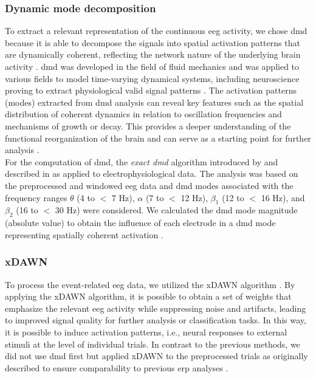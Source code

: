 \subsubsection{Dynamic mode decomposition}
To extract a relevant representation of the continuous \gls{eeg} activity, we chose \gls{dmd} because it is able to decompose the signals into spatial activation patterns that are dynamically coherent, reflecting the network nature of the underlying brain activity \cite{Brunton2016}. \Gls{dmd} was developed in the field of fluid mechanics and was applied to various fields to model time-varying dynamical systems, including neuroscience proving to extract physiological valid signal patterns \cite{Brunton2016, Kunert-Graf2019, Schmid2010, Schmid2008}. The activation patterns (modes) extracted from \gls{dmd} analysis can reveal key features such as the spatial distribution of coherent dynamics in relation to oscillation frequencies and mechanisms of growth or decay. This provides a deeper understanding of the functional reorganization of the brain and can serve as a starting point for further analysis \cite{Brunton2016}.\\
For the computation of \gls{dmd}, the \textit{exact \gls{dmd}} algorithm introduced by \citeauthor{Tu2014} \cite{Tu2014} and described in \cite{Brunton2016} as applied to electrophysiological data. The analysis was based on the preprocessed and windowed \gls{eeg} data and \gls{dmd} modes associated with the frequency ranges $\theta$ (4 to $<$ 7 Hz), $\alpha$ (7 to $<$ 12 Hz), $\beta_1$ (12 to $<$ 16 Hz), and $\beta_2$ (16 to $<$ 30 Hz) were considered. We calculated the \gls{dmd} mode magnitude (absolute value) to obtain the influence of each electrode in a \gls{dmd} mode representing spatially coherent activation \cite{Brunton2016}.

\subsubsection{xDAWN}
To process the event-related \gls{eeg} data, we utilized the xDAWN algorithm \cite{rivet2009xdawn}. By applying the xDAWN algorithm, it is possible to obtain a set of weights that emphasize the relevant \gls{eeg} activity while suppressing noise and artifacts, leading to improved signal quality for further analysis or classification tasks. In this way, it is possible to induce activation patterns, i.e., neural responses to external stimuli at the level of individual trials. In contrast to the previous methods, we did not use \gls{dmd} first but applied xDAWN to the preprocessed trials as originally described to ensure comparability to previous \gls{erp} analyses \cite{Reuter2019}.

